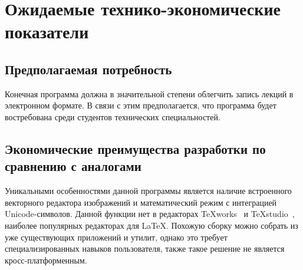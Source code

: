 \documentclass[explnote]{espd}
\begin{document}
\section{Ожидаемые технико-экономические показатели}
\subsection{Предполагаемая потребность}
Конечная программа должна в значительной степени облегчить запись лекций в электронном формате. В связи с этим предполагается, что программа будет востребована среди студентов технических специальностей.

\subsection{Экономические преимущества разработки по сравнению с аналогами}
Уникальными особенностями данной программы является наличие встроенного векторного редактора изображений и математический режим с интеграцией Unicode-символов. Данной функции нет в редакторах TeXworks~\cite{texworks} и TeXstudio~\cite{texstudio}, наиболее популярных редакторах для LaTeX. Похожую сборку можно собрать из уже существующих приложений и утилит, однако это требует специализированных навыков пользователя, также такое решение не является кросс-платформенным.



\begin{terms}
\end{terms}

\label{attachment:editor}

\label{attachment:insert}

\label{attachment:figure}

\label{attachment:example}
\end{document}
